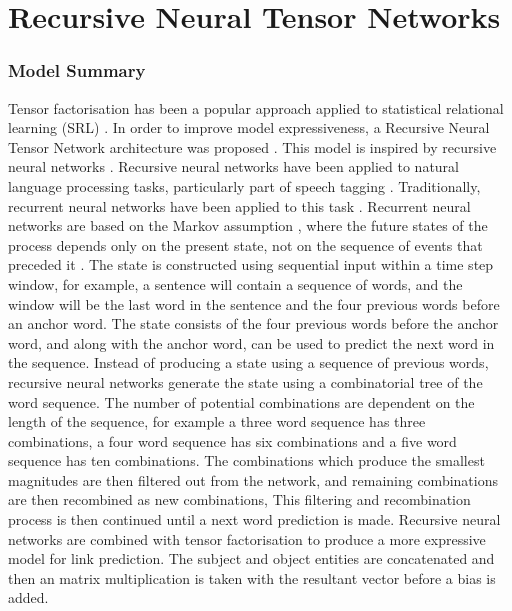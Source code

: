 \section{Recursive Neural Tensor Networks}
\subsubsection{Model Summary} 
Tensor factorisation has been a popular approach applied to statistical relational learning (SRL) \cite{reference, reference, reference}. In order to improve model expressiveness, a Recursive Neural Tensor Network architecture was proposed \cite{reference}. This model is inspired by recursive neural networks \cite{reference}. Recursive neural networks have been applied to natural language processing tasks, particularly part of speech tagging \cite{reference}. Traditionally, recurrent neural networks have been applied to this task \cite{reference}. Recurrent neural networks are based on the Markov assumption \cite{reference}, where the future states of the process depends only on the present state, not on the sequence of events that preceded it \cite{reference}. The state is constructed using sequential input within a time step window, for example, a sentence will contain a sequence of words, and the window will be the last word in the sentence and the four previous words before an anchor word. The state consists of the four previous words before the anchor word, and along with the anchor word, can be used to predict the next word in the sequence.\newline
Instead of producing a state using a sequence of previous words, recursive neural networks generate the state using a combinatorial tree of the word sequence. The number of potential combinations are dependent on the length of the sequence, for example a three word sequence has three combinations, a four word sequence has six combinations and  a five word sequence has ten combinations. The combinations which produce the smallest magnitudes are then filtered out from the network, and remaining combinations are then recombined as new combinations, This filtering and recombination process is then continued until a next word prediction is made. \newline
Recursive neural networks are combined with tensor factorisation to produce a more expressive model for link prediction. The subject and object entities are concatenated and then an matrix multiplication is taken with the resultant vector before a bias is added. \newline
